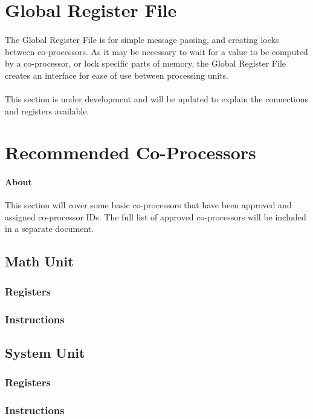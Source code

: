 \documentclass[letterpaper, 11pt]{article}
\begin{document}
\section{Global Register File}
\paragraph{}The Global Register File is for simple message passing, and creating locks between co-processors.
As it may be necessary to wait for a value to be computed by a co-processor, or lock specific parts of memory,
the Global Register File creates an interface for ease of use between processing units.
\paragraph{}This section is under development and will be updated to explain the connections and registers available.

\section{Recommended Co-Processors}
\paragraph{About} This section will cover some basic co-processors that have been approved and assigned co-processor IDs. The full list of approved co-processors will be included in a separate document. 
\subsection{Math Unit}
\subsubsection{Registers}
\subsubsection{Instructions}
\subsection{System Unit}
\subsubsection{Registers}
\subsubsection{Instructions}
\end{document}
